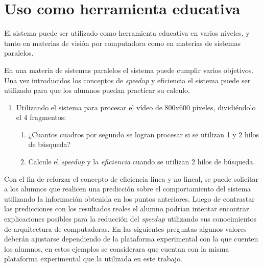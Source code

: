 
\section{Uso como herramienta educativa}

\label{usoEducativo}

El sistema puede ser utilizado como herramienta educativa en varios niveles, y
tanto en materias de visión por computadora como en materias de sistemas
paralelos.

En una materia de sistemas paralelos el sistema puede cumplir varios objetivos.
Una vez introducidos los conceptos de \emph{speedup} y eficiencia el sistema
puede ser utilizado para que los alumnos puedan practicar su calculo.

\begin{enumerate}

	\item{Utilizando el sistema para procesar el vídeo de 800x600 píxeles,
		dividiéndolo el 4 fragmentos:

\begin{enumerate}

	\item{¿Cuantos cuadros por segundo se logran procesar si se utilizan 1 y
		2 hilos de búsqueda?}

	\item{Calcule el \emph{speedup} y la \emph{eficiencia} cuando se
		utilizan 2 hilos de búsqueda.}

\end{enumerate}}

\end{enumerate}

Con el fin de reforzar el concepto de eficiencia linea y no lineal, se puede
solicitar a los alumnos que realicen una predicción sobre el comportamiento del
sistema utilizando la información obtenida en los puntos anteriores. Luego de
contrastar las predicciones con los resultados reales el alumno podrían intentar
encontrar explicaciones posibles para la reducción del \emph{speedup} utilizando
sus conocimientos de arquitectura de computadoras. En las siguientes preguntas
algunos valores deberán ajustarse dependiendo de la plataforma experimental con
la que cuenten los alumnos, en estos ejemplos se considerara que cuentan con la
misma plataforma experimental que la utilizada en este trabajo.

